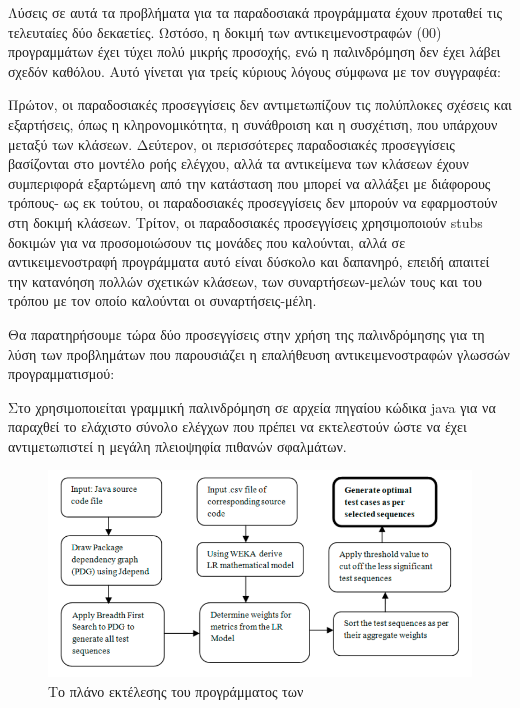 \documentclass[12pt]{article}
\begin{document}
\par Λύσεις σε αυτά τα προβλήματα για τα παραδοσιακά προγράμματα έχουν προταθεί τις τελευταίες δύο δεκαετίες. Ωστόσο, η δοκιμή των αντικειμενοστραφών (00) προγραμμάτων έχει τύχει πολύ μικρής προσοχής, ενώ η παλινδρόμηση δεν έχει λάβει σχεδόν καθόλου. Αυτό γίνεται για τρείς κύριους λόγους σύμφωνα με τον συγγραφέα:

\par Πρώτον, οι παραδοσιακές προσεγγίσεις δεν αντιμετωπίζουν τις πολύπλοκες σχέσεις και εξαρτήσεις, όπως η κληρονομικότητα, η συνάθροιση και η συσχέτιση, που υπάρχουν μεταξύ των κλάσεων. Δεύτερον, οι περισσότερες παραδοσιακές προσεγγίσεις βασίζονται στο μοντέλο ροής ελέγχου, αλλά τα αντικείμενα των κλάσεων έχουν συμπεριφορά εξαρτώμενη από την κατάσταση που μπορεί να αλλάξει με διάφορους τρόπους- ως εκ τούτου, οι παραδοσιακές προσεγγίσεις δεν μπορούν να εφαρμοστούν στη δοκιμή κλάσεων. Τρίτον, οι παραδοσιακές προσεγγίσεις χρησιμοποιούν stubs δοκιμών για να προσομοιώσουν τις μονάδες που καλούνται, αλλά σε αντικειμενοστραφή προγράμματα αυτό είναι δύσκολο και δαπανηρό, επειδή απαιτεί την κατανόηση πολλών σχετικών κλάσεων, των συναρτήσεων-μελών τους και του τρόπου με τον οποίο καλούνται οι συναρτήσεις-μέλη.

\par Θα παρατηρήσουμε τώρα δύο προσεγγίσεις στην χρήση της παλινδρόμησης για τη λύση των προβλημάτων που παρουσιάζει η επαλήθευση αντικειμενοστραφών γλωσσών προγραμματισμού:

\par Στο \textcite{divya} χρησιμοποιείται γραμμική παλινδρόμηση σε αρχεία πηγαίου κώδικα java για να παραχθεί το ελάχιστο σύνολο ελέγχων που πρέπει να εκτελεστούν ώστε να έχει αντιμετωπιστεί η μεγάλη πλειοψηφία πιθανών σφαλμάτων.

\begin{figure}
\label{fig:regression}
\caption{Το πλάνο εκτέλεσης του προγράμματος των \textcite{divya}}
\includegraphics[width=\textwidth,height=\textheight,keepaspectratio]{regression_plan.PNG}
\end{figure}
\end{document}
